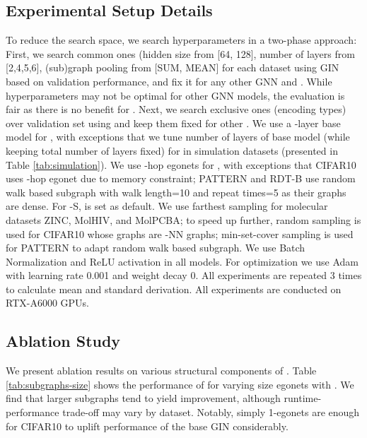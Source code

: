 \subsection{Experimental Setup Details}
\label{apdx:experimental-setup}
To reduce the search space, we search hyperparameters in a two-phase approach:  First, we search common ones (hidden size from [64, 128], number of layers  from [2,4,5,6], (sub)graph pooling from [SUM, MEAN] for each dataset using GIN based on validation performance, and fix it for any other GNN and \methodall. While hyperparameters may not be optimal for other GNN models, the evaluation is fair as there is no benefit for \methodall. Next, we search \methodall exclusive ones (encoding types) over validation set using  and keep them fixed for other .  
We use a -layer base model for , with exceptions that we tune  number of layers of base model (while keeping total number of layers fixed) for   in simulation datasets (presented in Table \ref{tab:simulation}). 
We use -hop egonets for , with exceptions that CIFAR10 uses -hop egonet due to memory constraint; PATTERN and RDT-B use random walk based subgraph with walk length=10 and repeat times=5 as their graphs are dense. For \methodall-S,   is set as default. We use farthest sampling for molecular datasets ZINC, MolHIV, and MolPCBA; to speed up further, random sampling is used for CIFAR10 whose graphs are -NN graphs; min-set-cover sampling is used for PATTERN to adapt random walk based subgraph.  
We use Batch Normalization and ReLU activation in all models. For optimization we use Adam with learning rate 0.001 and weight decay 0. All experiments are repeated 3 times to calculate mean and standard derivation. All experiments are conducted on RTX-A6000 GPUs. 






\subsection{Ablation Study}
\label{apdx:ablation}






We present ablation results on various structural components of \method.  
Table \ref{tab:subgraphs-size} shows the performance of  for varying size egonets with . We find that larger subgraphs tend to yield improvement, although runtime-performance trade-off may vary by dataset. Notably, simply 1-egonets are enough for CIFAR10 to uplift performance of the base GIN considerably. 
















